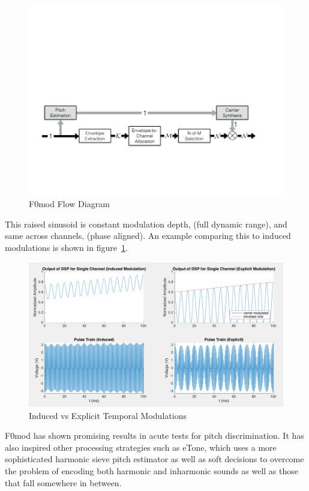 \documentclass [11pt, proquest,oneside] {uwthesis}[2015/03/03]
\begin{document}
\begin{figure}[!ht]
  \centering
    \includegraphics[width=1\textwidth]{F0mod_flow_diagram}   
    \caption{F0mod Flow Diagram}
\end{figure}

This raised sinusoid is constant modulation depth, (full dynamic range), and same across channels, (phase aligned).  An example comparing this to induced modulations is shown in figure~\ref{fig:induced_vs_explicit}.


\begin{figure}[!ht]
  \centering
    \includegraphics[width=1\textwidth]{induced_vs_explicit}   
    \caption{Induced vs Explicit Temporal Modulations}\label{fig:induced_vs_explicit}
\end{figure}

F0mod has shown promising results in acute tests for pitch discrimination.  It has also inspired other processing strategies such as eTone, which uses a more sophisticated harmonic sieve pitch estimator as well as soft decisions to overcome the problem of encoding both harmonic and inharmonic sounds as well as those that fall somewhere in between.
\end{document}
